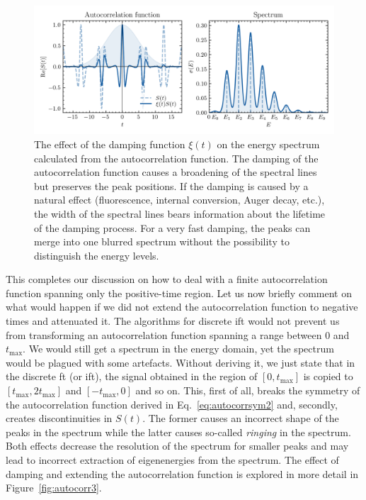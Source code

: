 \begin{figure}[ht!]
    \centering
    \includegraphics[width=0.9\linewidth]{scriptum/obrazky/autocorr/autocorr2.png}
    \caption{The effect of the damping function $\xi(t)$ on the energy spectrum calculated from the autocorrelation function. The damping of the autocorrelation function causes a broadening of the spectral lines but preserves the peak positions. If the damping is caused by a natural effect (fluorescence, internal conversion, Auger decay, etc.), the width of the spectral lines bears information about the lifetime of the damping process. For a very fast damping, the peaks can merge into one blurred spectrum without the possibility to distinguish the energy levels.}
    \label{fig:autocorr2}
\end{figure}

This completes our discussion on how to deal with a finite autocorrelation function spanning only the positive-time region. Let us now briefly comment on what would happen if we did not extend the autocorrelation function to negative times and attenuated it. The algorithms for discrete \acrshort{ift} would not prevent us from transforming an autocorrelation function spanning a range between 0 and $t_\mathrm{max}$. We would still get a spectrum in the energy domain, yet the spectrum would be plagued with some artefacts. Without deriving it, we just state that in the discrete \acrshort{ft} (or \acrshort{ift}), the signal obtained in the region of $[0, t_\mathrm{max}]$ is copied to $[t_\mathrm{max}, 2t_\mathrm{max}]$ and $[-t_\mathrm{max}, 0]$ and so on. This, first of all, breaks the symmetry of the autocorrelation function derived in Eq.~\eqref{eq:autocorrsym2} and, secondly, creates discontinuities in $S(t)$. The former causes an incorrect shape of the peaks in the spectrum while the latter causes so-called \textit{ringing} in the spectrum. Both effects decrease the resolution of the spectrum for smaller peaks and may lead to incorrect extraction of eigenenergies from the spectrum. The effect of damping and extending the autocorrelation function is explored in more detail in Figure~\ref{fig:autocorr3}.

